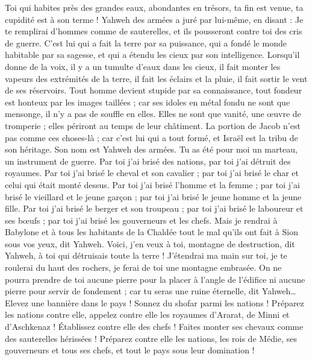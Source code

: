 \begin{multicols}{2}
Toi qui habites près des grandes eaux, abondantes en trésors, ta fin est venue, ta cupidité est à son terme !
Yahweh des armées a juré par lui-même, en disant : Je te remplirai d'hommes comme de sauterelles, et ils pousseront contre toi des cris de guerre.
C'est lui qui a fait la terre par sa puissance, qui a fondé le monde habitable par sa sagesse, et qui a étendu les cieux par son intelligence.
Lorsqu'il donne de la voix, il y a un tumulte d'eaux dans les cieux, il fait monter les vapeurs des extrémités de la terre, il fait les éclairs et la pluie, il fait sortir le vent de ses réservoirs.
Tout homme devient stupide par sa connaissance, tout fondeur est honteux par les images taillées ; car ses idoles en métal fondu ne sont que mensonge, il n'y a pas de souffle en elles.
Elles ne sont que vanité, une œuvre de tromperie ; elles périront au temps de leur châtiment.
La portion de Jacob n'est pas comme ces choses-là ; car c'est lui qui a tout formé, et Israël est la tribu de son héritage. Son nom est Yahweh des armées.
Tu as été pour moi un marteau, un instrument de guerre. Par toi j'ai brisé des nations, par toi j'ai détruit des royaumes.
Par toi j'ai brisé le cheval et son cavalier ; par toi j'ai brisé le char et celui qui était monté dessus.
Par toi j'ai brisé l'homme et la femme ; par toi j'ai brisé le vieillard et le jeune garçon ; par toi j'ai brisé le jeune homme et la jeune fille.
Par toi j'ai brisé le berger et son troupeau ; par toi j'ai brisé le laboureur et ses bœufs ; par toi j'ai brisé les gouverneurs et les chefs.
Mais je rendrai à Babylone et à tous les habitants de la Chaldée tout le mal qu'ils ont fait à Sion sous vos yeux, dit Yahweh.
Voici, j'en veux à toi, montagne de destruction, dit Yahweh, à toi qui détruisais toute la terre ! J'étendrai ma main sur toi, je te roulerai du haut des rochers, je ferai de toi une montagne embrasée.
On ne pourra prendre de toi aucune pierre pour la placer à l'angle de l'édifice ni aucune pierre pour servir de fondement ; car tu seras une ruine éternelle, dit Yahweh…
Elevez une bannière dans le pays ! Sonnez du shofar parmi les nations ! Préparez les nations contre elle, appelez contre elle les royaumes d'Ararat, de Minni et d'Aschkenaz ! Établissez contre elle des chefs ! Faites monter ses chevaux comme des sauterelles hérissées !
Préparez contre elle les nations, les rois de Médie, ses gouverneurs et tous ses chefs, et tout le pays sous leur domination !

\end{multicols}
